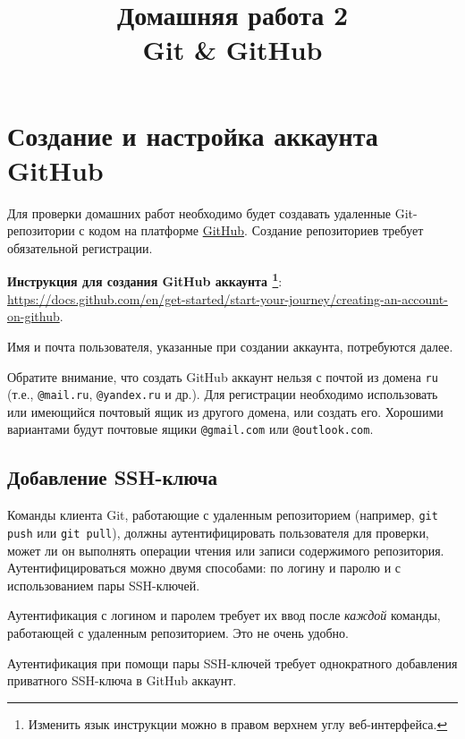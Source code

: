 \documentclass[14pt]{extarticle}
\title{Домашняя работа 2 \\ Git \& GitHub}
\begin{document}
\maketitle

\tableofcontents

\section{Создание и настройка аккаунта GitHub}

    Для проверки домашних работ необходимо будет создавать
    удаленные Git-репозитории с кодом на платформе
    \href{https://github.com/}{GitHub}.
    Создание репозиториев требует обязательной регистрации.

    \begin{tcolorbox}
        \textbf{Инструкция для создания GitHub аккаунта
        \footnote{Изменить язык инструкции можно в правом верхнем углу веб-интерфейса.}}: \\
        \url{https://docs.github.com/en/get-started/start-your-journey/creating-an-account-on-github}.
    \end{tcolorbox}

    Имя и почта пользователя, указанные при создании аккаунта, потребуются далее.

    Обратите внимание, что создать GitHub аккаунт нельзя с почтой из домена
    \verb|ru| (т.е., \verb|@mail.ru|, \verb|@yandex.ru| и др.).
    Для регистрации необходимо использовать или имеющийся почтовый ящик из другого
    домена, или создать его.
    Хорошими вариантами будут почтовые ящики \verb|@gmail.com| или \verb|@outlook.com|.

    \subsection{Добавление SSH-ключа}

        Команды клиента Git, работающие с удаленным репозиторием (например,
        \verb|git push| или \verb|git pull|), должны аутентифицировать пользователя
        для проверки, может ли он выполнять операции чтения или записи содержимого
        репозитория.
        Аутентифицироваться можно двумя способами: по логину и паролю и с использованием
        пары SSH-ключей.

        Аутентификация с логином и паролем требует их ввод после \textit{каждой}
        команды, работающей с удаленным репозиторием.
        Это не очень удобно.

        Аутентификация при помощи пары SSH-ключей требует однократного добавления
        приватного SSH-ключа в GitHub аккаунт.
\end{document}
